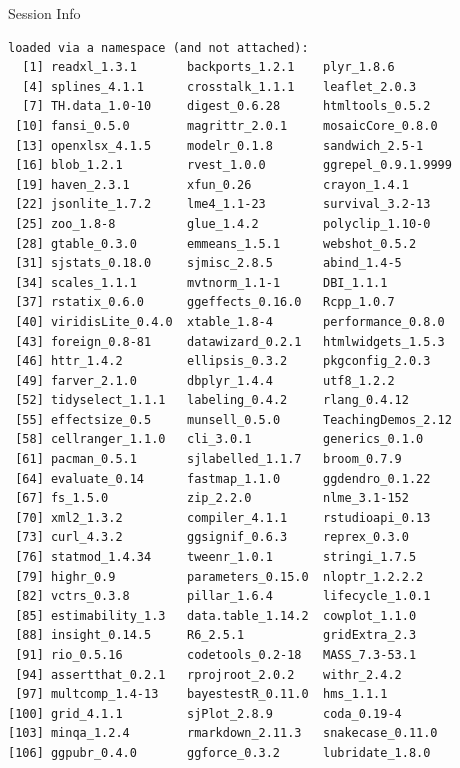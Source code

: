 \documentclass[10pt,handout]{beamer}\usepackage[]{graphicx}\usepackage[]{color}
\makeatletter
\newenvironment{kframe}{%
 \def\at@end@of@kframe{}%
 \ifinner\ifhmode%
  \def\at@end@of@kframe{\end{minipage}}%
  \begin{minipage}{\columnwidth}%
 \fi\fi%
 \def\FrameCommand##1{\hskip\@totalleftmargin \hskip-\fboxsep
 \colorbox{shadecolor}{##1}\hskip-\fboxsep
     \hskip-\linewidth \hskip-\@totalleftmargin \hskip\columnwidth}%
 \MakeFramed {\advance\hsize-\width
   \@totalleftmargin\z@ \linewidth\hsize
   \@setminipage}}%
 {\par\unskip\endMakeFramed%
 \at@end@of@kframe}
\newenvironment{knitrout}{}{} %
\makeatother
\begin{document}
\begin{frame}[fragile]{Session Info}
\begin{knitrout}
\begin{kframe}
\begin{verbatim}
loaded via a namespace (and not attached):
  [1] readxl_1.3.1       backports_1.2.1    plyr_1.8.6        
  [4] splines_4.1.1      crosstalk_1.1.1    leaflet_2.0.3     
  [7] TH.data_1.0-10     digest_0.6.28      htmltools_0.5.2   
 [10] fansi_0.5.0        magrittr_2.0.1     mosaicCore_0.8.0  
 [13] openxlsx_4.1.5     modelr_0.1.8       sandwich_2.5-1    
 [16] blob_1.2.1         rvest_1.0.0        ggrepel_0.9.1.9999
 [19] haven_2.3.1        xfun_0.26          crayon_1.4.1      
 [22] jsonlite_1.7.2     lme4_1.1-23        survival_3.2-13   
 [25] zoo_1.8-8          glue_1.4.2         polyclip_1.10-0   
 [28] gtable_0.3.0       emmeans_1.5.1      webshot_0.5.2     
 [31] sjstats_0.18.0     sjmisc_2.8.5       abind_1.4-5       
 [34] scales_1.1.1       mvtnorm_1.1-1      DBI_1.1.1         
 [37] rstatix_0.6.0      ggeffects_0.16.0   Rcpp_1.0.7        
 [40] viridisLite_0.4.0  xtable_1.8-4       performance_0.8.0 
 [43] foreign_0.8-81     datawizard_0.2.1   htmlwidgets_1.5.3 
 [46] httr_1.4.2         ellipsis_0.3.2     pkgconfig_2.0.3   
 [49] farver_2.1.0       dbplyr_1.4.4       utf8_1.2.2        
 [52] tidyselect_1.1.1   labeling_0.4.2     rlang_0.4.12      
 [55] effectsize_0.5     munsell_0.5.0      TeachingDemos_2.12
 [58] cellranger_1.1.0   cli_3.0.1          generics_0.1.0    
 [61] pacman_0.5.1       sjlabelled_1.1.7   broom_0.7.9       
 [64] evaluate_0.14      fastmap_1.1.0      ggdendro_0.1.22   
 [67] fs_1.5.0           zip_2.2.0          nlme_3.1-152      
 [70] xml2_1.3.2         compiler_4.1.1     rstudioapi_0.13   
 [73] curl_4.3.2         ggsignif_0.6.3     reprex_0.3.0      
 [76] statmod_1.4.34     tweenr_1.0.1       stringi_1.7.5     
 [79] highr_0.9          parameters_0.15.0  nloptr_1.2.2.2    
 [82] vctrs_0.3.8        pillar_1.6.4       lifecycle_1.0.1   
 [85] estimability_1.3   data.table_1.14.2  cowplot_1.1.0     
 [88] insight_0.14.5     R6_2.5.1           gridExtra_2.3     
 [91] rio_0.5.16         codetools_0.2-18   MASS_7.3-53.1     
 [94] assertthat_0.2.1   rprojroot_2.0.2    withr_2.4.2       
 [97] multcomp_1.4-13    bayestestR_0.11.0  hms_1.1.1         
[100] grid_4.1.1         sjPlot_2.8.9       coda_0.19-4       
[103] minqa_1.2.4        rmarkdown_2.11.3   snakecase_0.11.0  
[106] ggpubr_0.4.0       ggforce_0.3.2      lubridate_1.8.0   
\end{verbatim}
\end{kframe}
\end{knitrout}
	
\end{frame}
\end{document}
